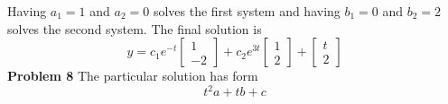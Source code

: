 Having $a_1 = 1$ and $a_2 = 0$ solves the first system and 
having $b_1 = 0$ and $b_2 = 2$ solves the second system.
The final solution is 
\[
    y = c_1e^{-t} 
    \begin{bmatrix}
        1 \\ -2
    \end{bmatrix} +
    c_2e^{3t}
    \begin{bmatrix}
        1 \\ 2
    \end{bmatrix} +
    \begin{bmatrix}
        t \\ 2
    \end{bmatrix}
\]
\textbf{Problem 8}
The particular solution has form 
\[
    t^2a + tb + c
\]